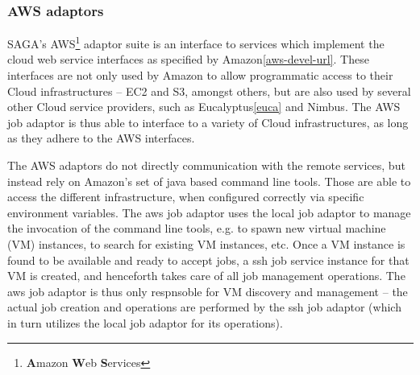 \documentclass[conference,final]{IEEEtran}
\newcommand{\upp}{\vspace*{-0.5em}}
\newcommand{\B}[1]{\textbf{#1}}
\newcommand{\sshfs}[1]{\texttt{sshfs}}
\begin{document}



\subsubsection{AWS adaptors}

SAGA's AWS\footnote{\B{A}mazon \B{W}eb \B{S}ervices} adaptor suite is
an interface to services which implement the cloud web service
interfaces as specified by Amazon\ref{aws-devel-url}.  These
interfaces are not only used by Amazon to allow programmatic access to
their Cloud infrastructures -- EC2 and S3, amongst others, but are
also used by several other Cloud service providers, such as
Eucalyptus\ref{euca} and Nimbus.  The AWS job adaptor is thus able to
interface to a variety of Cloud infrastructures, as long as they
adhere to the AWS interfaces.

The AWS adaptors do not directly communication with the remote
services, but instead rely on Amazon's set of java based command line
tools.  Those are able to access the different infrastructure, when
configured correctly via specific environment variables.  The aws job
adaptor uses the local job adaptor to manage the invocation of the
command line tools, e.g. to spawn new virtual machine (VM) instances,
to search for existing VM instances, etc.  Once a VM instance is found
to be available and ready to accept jobs, a ssh job service instance
for that VM is created, and henceforth takes care of all job
management operations.  The aws job adaptor is thus only respnsoble
for VM discovery and management -- the actual job creation and
operations are performed by the ssh job adaptor (which in turn
utilizes the local job adaptor for its operations).
\end{document}
